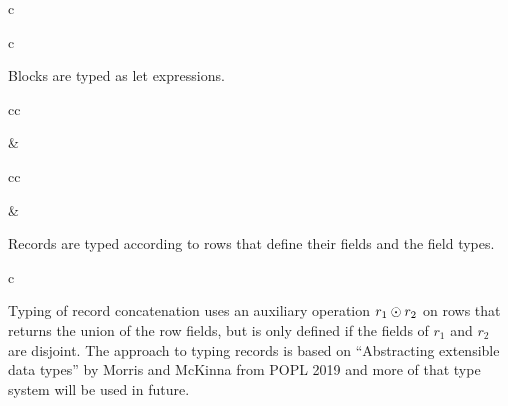 \documentclass[11pt]{article}
\begin{document}
\begin{rules}{c}

\end{rules}

\begin{rules}{c}


\end{rules}

Blocks are typed as let expressions.

\begin{rules}{cc}


&


\end{rules}

\begin{rules}{cc}


&


\end{rules}

Records are typed according to rows that define their fields and the field types.

\begin{rules}{c}


\end{rules}

Typing of record concatenation uses an auxiliary operation $r_1 \odot r_2$ on rows that returns the union of the row fields, but is only defined if the fields of $r_1$ and $r_2$ are disjoint.
The approach to typing records is based on ``Abstracting extensible data types'' by Morris and McKinna from POPL 2019 and more of that type system will be used in future.
\end{document}
